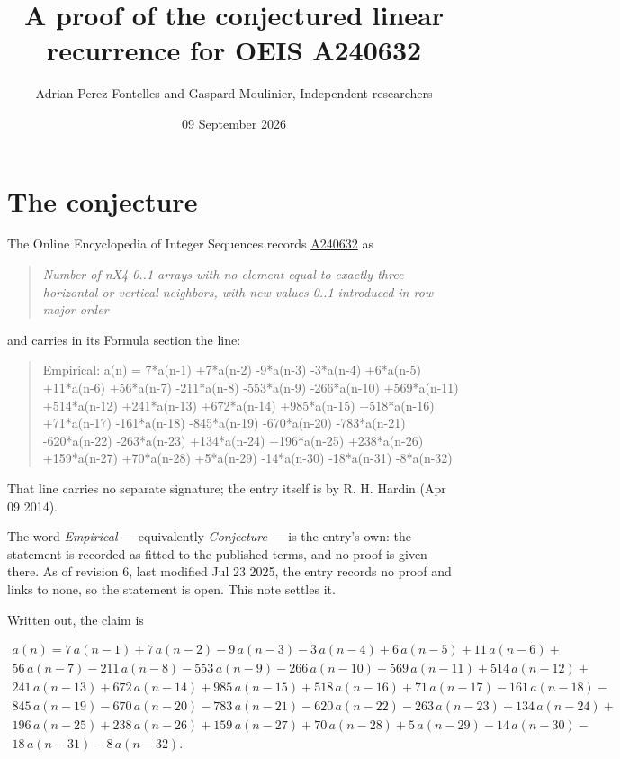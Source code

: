 \documentclass[11pt]{article}
\title{A proof of the conjectured linear recurrence for OEIS A240632}
\author{Adrian Perez Fontelles and Gaspard Moulinier, Independent researchers}
\date{09 September 2026}
\theoremstyle{definition}
\begin{document}
\maketitle
\section{The conjecture}

The Online Encyclopedia of Integer Sequences records \href{https://oeis.org/A240632}{A240632} as

\begin{quote}\itshape Number of nX4 0..1 arrays with no element equal to exactly three horizontal or vertical neighbors, with new values 0..1 introduced in row major order\end{quote}

and carries in its Formula section the line:

\begin{quote}\ttfamily Empirical: a(n) = 7*a(n-1) +7*a(n-2) -9*a(n-3) -3*a(n-4) +6*a(n-5) +11*a(n-6) +56*a(n-7) -211*a(n-8) -553*a(n-9) -266*a(n-10) +569*a(n-11) +514*a(n-12) +241*a(n-13) +672*a(n-14) +985*a(n-15) +518*a(n-16) +71*a(n-17) -161*a(n-18) -845*a(n-19) -670*a(n-20) -783*a(n-21) -620*a(n-22) -263*a(n-23) +134*a(n-24) +196*a(n-25) +238*a(n-26) +159*a(n-27) +70*a(n-28) +5*a(n-29) -14*a(n-30) -18*a(n-31) -8*a(n-32)\end{quote}

That line carries no separate signature; the entry itself is by R. H. Hardin (Apr 09 2014).

The word {\itshape Empirical} --- equivalently {\itshape Conjecture} --- is the entry's own: the statement is recorded as fitted to the published terms, and no proof is given there. As of revision 6, last modified Jul 23 2025, the entry records no proof and links to none, so the statement is open. This note settles it.

Written out, the claim is

\begin{multline*} a(n) = 7\,a(n-1) + 7\,a(n-2) - 9\,a(n-3) - 3\,a(n-4) + 6\,a(n-5) + 11\,a(n-6) + \\ 56\,a(n-7) - 211\,a(n-8) - 553\,a(n-9) - 266\,a(n-10) + 569\,a(n-11) + 514\,a(n-12) + \\ 241\,a(n-13) + 672\,a(n-14) + 985\,a(n-15) + 518\,a(n-16) + 71\,a(n-17) - 161\,a(n-18) - \\ 845\,a(n-19) - 670\,a(n-20) - 783\,a(n-21) - 620\,a(n-22) - 263\,a(n-23) + 134\,a(n-24) + \\ 196\,a(n-25) + 238\,a(n-26) + 159\,a(n-27) + 70\,a(n-28) + 5\,a(n-29) - 14\,a(n-30) - \\ 18\,a(n-31) - 8\,a(n-32). \end{multline*}
\end{document}
